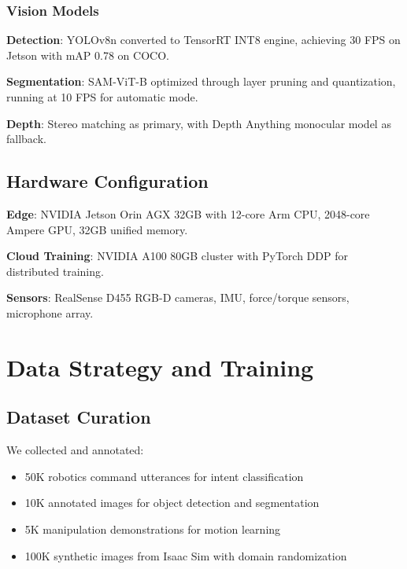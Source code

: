 \documentclass[conference]{IEEEtran}
\begin{document}
\subsubsection{Vision Models}

\textbf{Detection}: YOLOv8n converted to TensorRT INT8 engine, achieving 30 FPS on Jetson with mAP 0.78 on COCO.

\textbf{Segmentation}: SAM-ViT-B optimized through layer pruning and quantization, running at 10 FPS for automatic mode.

\textbf{Depth}: Stereo matching as primary, with Depth Anything monocular model as fallback.

\subsection{Hardware Configuration}

\textbf{Edge}: NVIDIA Jetson Orin AGX 32GB with 12-core Arm CPU, 2048-core Ampere GPU, 32GB unified memory.

\textbf{Cloud Training}: NVIDIA A100 80GB cluster with PyTorch DDP for distributed training.

\textbf{Sensors}: RealSense D455 RGB-D cameras, IMU, force/torque sensors, microphone array.

\section{Data Strategy and Training}
\label{sec:data}

\subsection{Dataset Curation}

We collected and annotated:
\begin{itemize}
    \item 50K robotics command utterances for intent classification
    \item 10K annotated images for object detection and segmentation
    \item 5K manipulation demonstrations for motion learning
    \item 100K synthetic images from Isaac Sim with domain randomization
\end{itemize}
\end{document}
